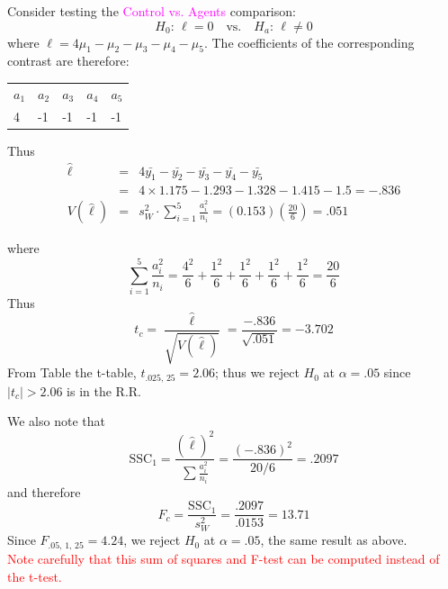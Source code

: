 \documentclass[xcolor=dvipsnames,12pt]{beamer}
\begin{document}
\begin{frame}
 Consider testing the {\textcolor{magenta}{Control vs. Agents}} comparison:
$$H_0:\,\ell = 0 \quad \mbox{vs.} \quad H_a:\, \ell \neq 0$$
where $\ell = 4\mu_1-\mu_2-\mu_3-\mu_4-\mu_5$. The 
coefficients of the corresponding contrast are therefore:
\begin{center}
\begin{tabular*}{3in}{@{\extracolsep{\fill}}lllll}
$a_1$ & $a_2$ & $a_3$ & $a_4$ & $a_5$\\
4 & -1 & -1 & -1 & -1 
\end{tabular*}
\end{center}
 Thus \\[-.3in]
\begin{eqnarray*}
\hat{\ell} & = & 4\bar{y_1}-\bar{y_2}-\bar{y_3}-\bar{y_4}-\bar{y_5}\\
 & = & 4\times1.175 -1.293 -1.328 -1.415 -1.5=-.836\\[.1in]
 V(\hat{\ell}) & = & s^2_W\cdot\sum^5_{i=1}
\frac{a^2_i}{n_i}=(0.153)\left(\frac{20}{6}\right)=.051
\end{eqnarray*}
\end{frame}
 
 
\begin{frame} 
where 
$$\sum^5_{i=1}\frac{a^2_i}{n_i}=\frac{4^2}{6}+\frac{1^2}{6}+\frac{1^2}{6}+\frac{1^2}{6}+\frac{1^2}{6}=\frac{20}{6}$$
Thus 
$$
t_c=\frac{\hat{\ell}}{\sqrt{V(\hat{\ell})}}=\frac{-.836}{\sqrt{.051}}=-3.702$$
From Table the t-table, $t_{.025,\,25}=2.06$; thus we reject $H_0$ at
$\alpha=.05$ since $|t_c|>2.06$ is in the R.R.
\end{frame}



\begin{frame}
 We also note that\\[-.3in]
$$\mbox{SSC}_1=\frac{(\hat{\ell})^2}{\sum\frac{a^2_i}{n_i}}=\frac{(-.836)^2}{20/6}=.2097$$
and therefore \\[-.3in]
$$ F_c= \frac{\mbox{SSC}_1}{s^2_W}=\frac{.2097}{.0153}=13.71$$
Since $F_{.05,\,1,\,25}=4.24$, we reject  $H_0$ at
$\alpha=.05$, the same result as above. \\[.01in]
 {\textcolor{red}{Note carefully that this sum of squares and F-test can be computed instead of the t-test.}}
 \end{frame}
\end{document}
